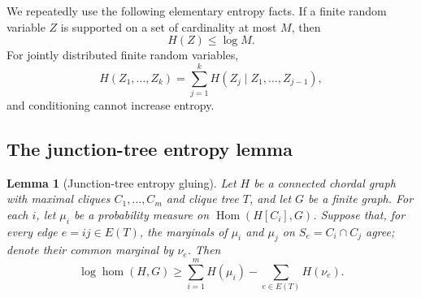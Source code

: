 \documentclass[11pt]{article}
\newtheorem{lemma}[lemma]{Lemma}
\numberwithin{equation}{section}
\DeclareMathOperator{\Hom}{Hom}
\DeclareMathOperator{\homnum}{hom}
\begin{document}
We repeatedly use the following elementary entropy facts.  If a finite
random variable $Z$ is supported on a set of cardinality at most $M$,
then
\begin{equation}
 H(Z)\leq\log M.\label{eq:support-entropy}
\end{equation}
For jointly distributed finite random variables,
\begin{equation}
 H(Z_1,\dots,Z_k)
 =
 \sum_{j=1}^k H(Z_j\mid Z_1,\dots,Z_{j-1}),\label{eq:entropy-chain}
\end{equation}
and conditioning cannot increase entropy.

\subsection{The junction-tree entropy lemma}

\begin{lemma}[Junction-tree entropy gluing]\label{lem:junction-entropy}
Let $H$ be a connected chordal graph with maximal cliques
$C_1,\dots,C_m$ and clique tree $T$, and let $G$ be a finite graph.  For
each $i$, let $\mu_i$ be a probability measure on
$\Hom(H[C_i],G)$.  Suppose that, for every edge $e=ij\in E(T)$, the
marginals of $\mu_i$ and $\mu_j$ on
$S_e=C_i\cap C_j$ agree; denote their common marginal by $\nu_e$.
Then
\begin{equation}
 \log\homnum(H,G)
 \geq
 \sum_{i=1}^m H(\mu_i)
 -
 \sum_{e\in E(T)}H(\nu_e).\label{eq:junction-entropy}
\end{equation}
\end{lemma}
\end{document}
